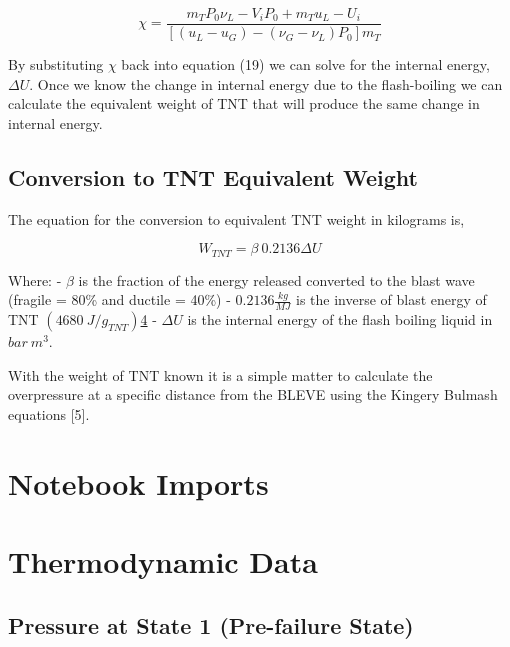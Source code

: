 \documentclass[10pt,parskip=half,
toc=sectionentrywithdots,
bibliography=totocnumbered,
captions=tableheading,numbers=noendperiod]{scrartcl}
\begin{document}
\begin{equation}\chi = \frac{m_TP_0\nu_L-V_iP_0+m_Tu_L-U_i}{\left[(u_L-u_G)-(\nu_G-\nu_L)P_0 \right]m_T}\end{equation}

By substituting \(\chi\) back into equation (19) we can solve for the
internal energy, \(\Delta U\). Once we know the change in internal
energy due to the flash-boiling we can calculate the equivalent weight
of TNT that will produce the same change in internal energy.

\hypertarget{conversion-to-tnt-equivalent-weight}{%
\subsection{Conversion to TNT Equivalent
Weight}\label{conversion-to-tnt-equivalent-weight}}

The equation for the conversion to equivalent TNT weight in kilograms
is,

\begin{equation}W_{TNT} = \beta\: 0.2136 \Delta U\end{equation}

Where: - \(\beta\) is the fraction of the energy released converted to
the blast wave (fragile = 80\% and ductile = 40\%) -
\(0.2136\frac{kg}{MJ}\) is the inverse of blast energy of TNT
\(\left(4680\:J/g_{TNT}\right)\)\href{https://books.google.com/books?id=Id15BgAAQBAJ\&pg=PA2\&lpg=PA2\&dq=tnt+4680+J/g\&source=bl\&ots=qx-7s6EAHa\&sig=ACfU3U1wcca5cWLX38lBoxDvvRqH0uaZ5g\&hl=en\&sa=X\&ved=2ahUKEwiN2cDP1pHjAhWnm-AKHfBYCGkQ6AEwAHoECAkQAQ\#v=onepage\&q=tnt\%204680\%20J\%2Fg\&f=false}{4}
- \(\Delta U\) is the internal energy of the flash boiling liquid in
\(bar\:m^3\).

With the weight of TNT known it is a simple matter to calculate the
overpressure at a specific distance from the BLEVE using the Kingery
Bulmash equations {[}5{]}.

\hypertarget{notebook-imports}{%
\section{Notebook Imports}\label{notebook-imports}}

\hypertarget{thermodynamic-data}{%
\section{Thermodynamic Data}\label{thermodynamic-data}}

\hypertarget{pressure-at-state-1-pre-failure-state}{%
\subsection{Pressure at State 1 (Pre-failure
State)}\label{pressure-at-state-1-pre-failure-state}}
\end{document}

